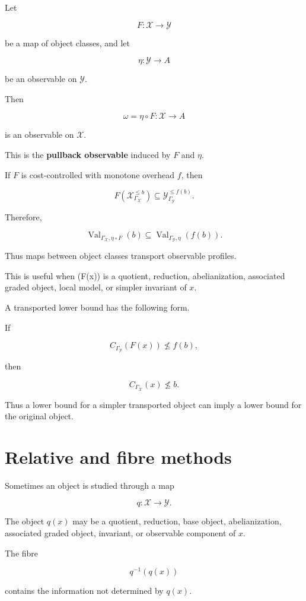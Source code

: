 \documentclass[11pt]{article}
\begin{document}
Let

\[
F:\mathcal X\to\mathcal Y
\]

be a map of object classes, and let

\[
\eta:\mathcal Y\to A
\]

be an observable on \(\mathcal Y\).

Then

\[
\omega=\eta\circ F:\mathcal X\to A
\]

is an observable on \(\mathcal X\).

This is the \textbf{pullback observable} induced by \(F\) and \(\eta\).

If \(F\) is cost-controlled with monotone overhead \(f\), then

\[
F(\mathcal X_{\Gamma_\mathcal X}^{\leq b})
\subseteq
\mathcal Y_{\Gamma_\mathcal Y}^{\leq f(b)}.
\]

Therefore,

\[
\operatorname{Val}_{\Gamma_\mathcal X,\eta\circ F}(b)
\subseteq
\operatorname{Val}_{\Gamma_\mathcal Y,\eta}(f(b)).
\]

Thus maps between object classes transport observable profiles.

This is useful when (F(x)) is a quotient, reduction, abelianization, associated graded object, local model, or simpler invariant of \(x\).

A transported lower bound has the following form.

If

\[
C_{\Gamma_\mathcal Y}(F(x))\nleq f(b),
\]

then

\[
C_{\Gamma_\mathcal X}(x)\nleq b.
\]

Thus a lower bound for a simpler transported object can imply a lower bound for the original object.


\section{Relative and fibre methods}

Sometimes an object is studied through a map

\[
q:\mathcal X\to\mathcal Y.
\]

The object \(q(x)\) may be a quotient, reduction, base object, abelianization, associated graded object, invariant, or observable component of \(x\).

The fibre

\[
q^{-1}(q(x))
\]

contains the information not determined by \(q(x)\).
\end{document}
